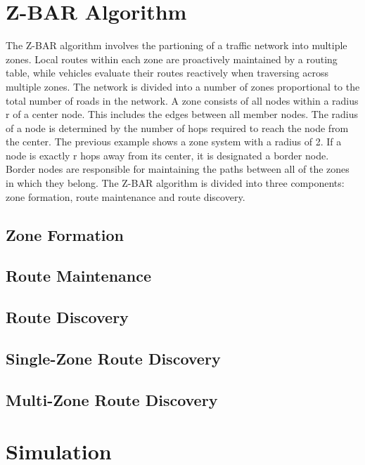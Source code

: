 \documentclass[conference]{IEEEtran}
\begin{document}
\section{Z-BAR Algorithm} %

The Z-BAR algorithm involves the partioning of a traffic network into multiple zones. Local routes within each zone are proactively maintained by a routing table, while vehicles evaluate their routes reactively when traversing across multiple zones. The network is divided into a number of zones proportional to the total number of roads in the network. A zone consists of all nodes within a radius r of a center node. This includes the edges between all member nodes. The radius of a node is determined by the number of hops required to reach the node from the center. The previous example shows a zone system with a radius of 2. If a node is exactly r hops away from its center, it is designated a border node. Border nodes are responsible for maintaining the paths between all of the zones in which they belong. The Z-BAR algorithm is divided into three components: zone formation, route maintenance and route discovery.

\subsection{Zone Formation}

\subsection{Route Maintenance}

\subsection{Route Discovery}

\subsection{Single-Zone Route Discovery}

\subsection{Multi-Zone Route Discovery}

\section{Simulation}
\end{document}
